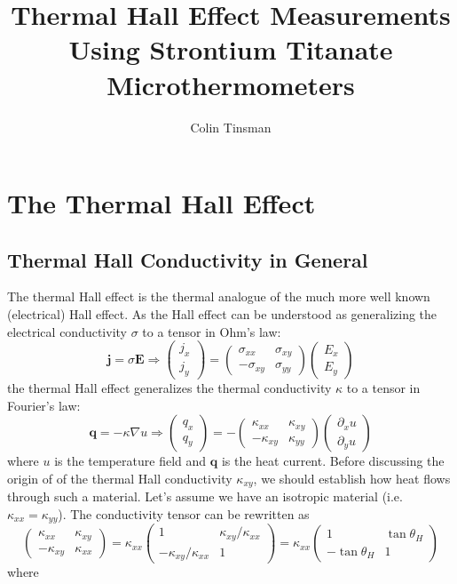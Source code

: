 \documentclass{thesis-umich}
\author{Colin Tinsman}
\title{Thermal Hall Effect Measurements Using Strontium Titanate Microthermometers}
\begin{document}
\doublespacing
\chapter{The Thermal Hall Effect}


\section{Thermal Hall Conductivity in General}

The thermal Hall effect is the thermal analogue of the much more well known
(electrical) Hall effect. As the Hall effect can be understood as generalizing
the electrical conductivity \(\sigma\) to a tensor in Ohm's law: \[\mathbf{j} =
	\sigma \mathbf{E} \Rightarrow \begin{pmatrix} j_x \\ j_y \end{pmatrix}
= \begin{pmatrix} \sigma_{xx} & \sigma_{xy} \\ -\sigma_{xy} & \sigma_{yy}
\end{pmatrix} \begin{pmatrix} E_x \\ E_y \end{pmatrix} \] the thermal Hall
effect generalizes the thermal conductivity \(\kappa\) to a tensor in Fourier's
law: \[\mathbf{q} = -\kappa \nabla u \Rightarrow \begin{pmatrix} q_x \\ q_y
	\end{pmatrix} = -\begin{pmatrix} \kappa_{xx} & \kappa_{xy} \\
		-\kappa_{xy} & \kappa_{yy} \end{pmatrix} \begin{pmatrix}
		\partial_x u \\ \partial_y u \end{pmatrix} \] where \(u\) is
	the temperature field and \(\mathbf{q}\) is the heat current. Before
	discussing the origin of of the thermal Hall conductivity
	\(\kappa_{xy}\), we should establish how heat flows through such a
	material. Let's assume we have an isotropic material (i.e.
	\(\kappa_{xx} = \kappa_{yy}\)). The conductivity tensor can be
	rewritten as \[\begin{pmatrix} \kappa_{xx} & \kappa_{xy} \\
			-\kappa_{xy} & \kappa_{xx} \end{pmatrix} = \kappa_{xx}
		\begin{pmatrix} 1 & \kappa_{xy}/\kappa_{xx} \\
		-\kappa_{xy}/\kappa_{xx} & 1 \end{pmatrix} = \kappa_{xx}
\begin{pmatrix} 1 & \tan \theta_H \\ -\tan \theta_H & 1 \end{pmatrix} \] where
\end{document}
